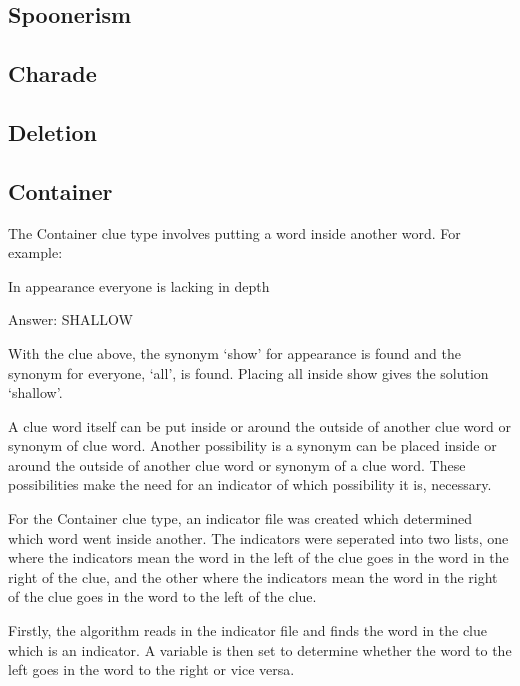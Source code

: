 \subsection{Spoonerism}

\subsection{Charade}

\subsection{Deletion}

\subsection{Container}

The Container clue type involves putting a word inside another word.
 For example: 

In appearance everyone is lacking in depth

Answer: SHALLOW

With the clue above, the synonym `show' for appearance is found 
and the synonym for everyone, `all', is found. Placing all inside show 
gives the solution `shallow'. 

A clue word itself can be put inside or around the outside of another clue 
word or synonym of clue word. Another possibility is a synonym can be 
placed inside or around the outside of another clue word or synonym of 
a clue word. These possibilities make the need for an indicator of which 
possibility it is, necessary. 

For the Container clue type, an indicator file was created which determined 
which word went inside another. The indicators were seperated into two 
lists, one where the indicators mean the word in the left of the clue goes in 
the word in the right of the clue, and the other where the indicators mean 
the word in the right of the clue goes in the word to the left of the clue. 

Firstly, the algorithm reads in the indicator file and finds the word in the 
clue which is an indicator. A variable is then set to determine whether the 
word to the left goes in the word to the right or vice versa. 


